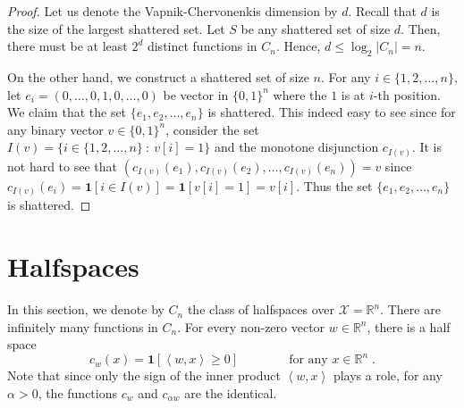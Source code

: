 \documentclass[10pt]{article}
\newcommand{\R}{\mathbb{R}}
\newcommand{\X}{\mathcal{X}}
\newcommand{\indicator}[1]{\mathbf{1}\left[{#1}\right]}
\newcommand{\ip}[2]{\left\langle #1, #2 \right\rangle}
\begin{document}
\begin{proof}
Let us denote the Vapnik-Chervonenkis dimension by $d$. Recall that $d$ is the
size of the largest shattered set. Let $S$ be any shattered set of size $d$.
Then, there must be at least $2^d$ distinct functions in $C_n$. Hence, $d \le
\log_2 |C_n| = n$.

On the other hand, we construct a shattered set of size $n$. For any $i \in
\{1,2,\dots,n\}$, let $e_i = (0, \dots, 0, 1, 0, \dots, 0)$ be vector in
$\{0,1\}^n$ where the $1$ is at $i$-th position. We claim that the set $\{e_1,
e_2, \dots, e_n\}$ is shattered. This indeed easy to see since for any binary
vector $v \in \{0,1\}^n$, consider the set $I(v) = \{ i \in \{1,2,\dots,n\} ~:~
v[i] = 1 \}$ and the monotone disjunction $c_{I(v)}$. It is not hard to see that
$(c_{I(v)}(e_1), c_{I(v)}(e_2), \dots, c_{I(v)}(e_n)) = v$ since $c_{I(v)}(e_i) =
\indicator{i \in I(v)} = \indicator{v[i] = 1} = v[i]$. Thus the set
$\{e_1, e_2, \dots, e_n\}$ is shattered.
\end{proof}


\section{Halfspaces}

In this section, we denote by $C_n$ the class of halfspaces over $\X = \R^n$. There
are infinitely many functions in $C_n$. For every non-zero vector $w \in \R^n$, there is a half space
$$
c_w(x) = \indicator{\ip{w}{x} \ge 0} \qquad \qquad \text{for any $x \in \R^n$} \; .
$$
Note that since only the sign of the inner product $\ip{w}{x}$ plays a role, for
any $\alpha > 0$, the functions $c_w$ and $c_{\alpha w}$ are the identical.




\end{document}
